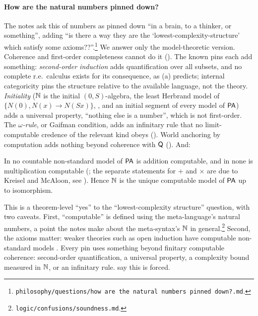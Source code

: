 \paragraph{How are the natural numbers pinned down?} The notes ask this of numbers as pinned down ``in a brain, to a thinker, or something'', adding ``is there a way they are the `lowest-complexity-structure' which satisfy some axioms??''.\footnote{\texttt{philosophy/questions/how are the natural numbers pinned down?.md}.} We answer only the model-theoretic version. Coherence and first-order completeness cannot do it (). The known pins each add something: \emph{second-order induction} \citep{dedekind1888zahlen} adds quantification over all subsets, and no complete r.e.\ calculus exists for its consequence, as (a) predicts; internal categoricity \citep{parsons1990uniqueness,mcgee1997how,button2018philosophy} pins the structure relative to the available language, not the theory. \emph{Initiality} ($\mathbb{N}$ is the initial $(0,S)$-algebra, the least Herbrand model of $\{N(0),N(x)\to N(Sx)\}$, \citealt{vanemden1976semantics}, and an initial segment of every model of $\mathsf{PA}$) adds a universal property, ``nothing else is a number'', which is not first-order. The \emph{$\omega$-rule}, or Gaifman condition, adds an infinitary rule that no limit-computable credence of the relevant kind obeys (). World anchoring by computation adds nothing beyond coherence with $\mathsf{Q}$ (). And:

\begin{theorem}[Tennenbaum]\label{thm:existence:tennenbaum}
In no countable non-standard model of $\mathsf{PA}$ is addition computable, and in none is multiplication computable (\citealt{tennenbaum1959non}; the separate statements for $+$ and $\times$ are due to Kreisel and McAloon, see \citealt{kaye1991models}). Hence $\mathbb{N}$ is the unique computable model of $\mathsf{PA}$ up to isomorphism.
\end{theorem}

This is a theorem-level ``yes'' to the ``lowest-complexity structure'' question, with two caveats. First, ``computable'' is defined using the meta-language's natural numbers, a point the notes make about the meta-syntax's $\mathbb{N}$ in general.\footnote{\texttt{logic/confusions/soundness.md}.} Second, the axioms matter: weaker theories such as open induction have computable non-standard models \citep{shepherdson1964nonstandard}. Every pin uses something beyond finitary computable coherence: second-order quantification, a universal property, a complexity bound measured in $\mathbb{N}$, or an infinitary rule.  say this is forced.
